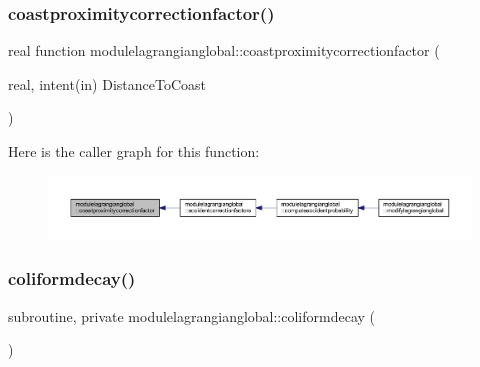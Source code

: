 \subsubsection{\texorpdfstring{coastproximitycorrectionfactor()}{coastproximitycorrectionfactor()}}
{\footnotesize\ttfamily real function modulelagrangianglobal\+::coastproximitycorrectionfactor (\begin{DoxyParamCaption}\item[{real, intent(in)}]{Distance\+To\+Coast }\end{DoxyParamCaption})\hspace{0.3cm}{\ttfamily [private]}}

Here is the caller graph for this function\+:\nopagebreak
\begin{figure}[H]
\begin{center}
\leavevmode
\includegraphics[width=350pt]{namespacemodulelagrangianglobal_a5ea7cad6f4171c5a773fbc1d09c57ebd_icgraph}
\end{center}
\end{figure}
\mbox{\label{namespacemodulelagrangianglobal_a1f9b10a52dd3091e18232addf8002dac}} 
\subsubsection{\texorpdfstring{coliformdecay()}{coliformdecay()}}
{\footnotesize\ttfamily subroutine, private modulelagrangianglobal\+::coliformdecay (\begin{DoxyParamCaption}{ }\end{DoxyParamCaption})\hspace{0.3cm}{\ttfamily [private]}}


